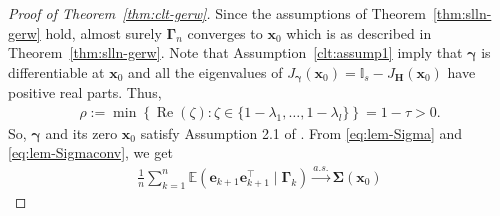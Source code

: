 \documentclass[12pt]{amsart}
\theoremstyle{plain}
\theoremstyle{remark}
\numberwithin{equation}{section}
\begin{document}
\begin{proof}[Proof of Theorem~\ref{thm:clt-gerw}] Since the assumptions of Theorem~\ref{thm:slln-gerw} hold, almost surely $\boldsymbol{\Gamma}_{n}$ converges to $\boldsymbol{x}_0$ which is as described in Theorem~\ref{thm:slln-gerw}. Note that Assumption~\ref{clt:assump1} imply that $\boldsymbol{\gamma}$ is differentiable at $\boldsymbol{x}_0$ and all the eigenvalues of $J_{\boldsymbol{\gamma}}\left(\boldsymbol{x}_0\right) = \mathbb{I}_s - J_{\boldsymbol{H}}\left(\boldsymbol{x}_0\right)$ have positive real parts. Thus,
\begin{align*}
       \rho := \min \left\{\operatorname{Re}\left(\zeta\right) : \zeta \in \{1 - \lambda_1, \ldots, 1 - \lambda_l\} \right\} = 1 - \tau > 0.
\end{align*}
So, $\boldsymbol{\gamma}$ and its zero $\boldsymbol{x}_0$ satisfy Assumption 2.1 of \cite{zhang2016central}. 
From \eqref{eq:lem-Sigma} and \eqref{eq:lem-Sigmaconv}, we get
\begin{align}\label{eq:Sigma-proof}
       \frac{1}{n}\sum_{k=1}^{n}\mathbb{E}\left(\boldsymbol{e}_{k+1}\boldsymbol{e}^{\top}_{k+1} \mid \boldsymbol{\Gamma}_{k}\right) \stackrel{a.s.}{\to} \boldsymbol{\Sigma}\left(\boldsymbol{x}_0\right)
\end{align}


\end{proof}
\end{document}
